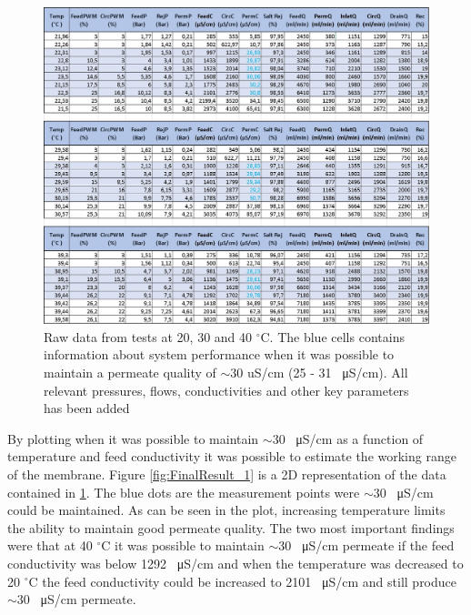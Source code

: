 \begin{figure}[H]
    \centering
    \includegraphics[width=1.1\textwidth]{Excel_plane}
    \caption{Raw data from tests at 20, 30 and 40  $^{\circ}$C. The blue cells contains information about system performance when it was possible to maintain a permeate quality of $\sim$30 uS/cm (25 - 31  \SI{}{\micro\siemens}/cm).  All relevant pressures, flows, conductivities and other key parameters has been added}
    \label{fig:Excel_plane}
\end{figure}

\newpage

By plotting when it was possible to maintain $\sim$30 \SI{}{\micro\siemens}/cm as a function of temperature and feed conductivity it was possible to estimate the working range of the membrane. Figure \ref{fig:FinalResult_1} is a 2D representation of the data contained in \ref{fig:Excel_plane}. The blue dots are the measurement points were $\sim$30 \SI{}{\micro\siemens}/cm could be maintained. As can be seen in the plot, increasing temperature limits the ability to maintain good permeate quality. The two most important findings were that at 40 $^{\circ}$C it was possible to maintain  $\sim$30 \SI{}{\micro\siemens}/cm permeate if the feed conductivity was below 1292 \SI{}{\micro\siemens}/cm and when the temperature was decreased to 20 $^{\circ}$C the feed conductivity could be increased to 2101 \SI{}{\micro\siemens}/cm and still produce  $\sim$30 \SI{}{\micro\siemens}/cm permeate.   

